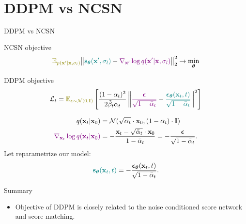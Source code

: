 \section{DDPM vs NCSN}
\begin{frame}{DDPM vs NCSN}
	\begin{block}{NCSN objective}
		\vspace{-0.2cm}
		\[
			{\color{olive}\bbE_{p(\bx' | \bx, \sigma_l)}}\bigl\| {\color{teal}\bs_{\btheta}(\bx', \sigma_l)} - {\color{violet}\nabla_{\bx'} \log q(\bx' | \bx, \sigma_l)} \bigr\|^2_2 \rightarrow \min_{\btheta}
		\]
	\end{block}
	\vspace{-0.3cm}
	\begin{block}{DDPM objective}
		\vspace{-0.2cm}
		\[
			\cL_t = {\color{olive}\bbE_{\bepsilon \sim \cN(0, \bI)}} \left[ \frac{(1 - \alpha_t)^2}{2\tilde{\beta}_t \alpha_t} \left\| {\color{violet}\frac{\bepsilon}{\sqrt{1 - \bar{\alpha}_t}}} - {\color{teal}\frac{\bepsilon_{\btheta}(\bx_t, t)}{\sqrt{1 - \bar{\alpha}_t}}}\right\|^2 \right]
		\]
		\vspace{-0.7cm}
	\end{block}
	\begin{align*}
		q(\mathbf{x}_t | \mathbf{x}_0) &= \mathcal{N}(\sqrt{\bar{\alpha}_t} \cdot \mathbf{x}_0, (1 - \bar{\alpha}_t) \cdot \mathbf{I}) \\
		{\color{violet}\nabla_{\mathbf{x}_t} \log q(\mathbf{x}_t | \mathbf{x}_0)} &= - \frac{\mathbf{x}_t - \sqrt{\bar{\alpha}_t} \cdot \mathbf{x}_0}{1 - \bar{\alpha}_t} = - \frac{\boldsymbol{\epsilon}}{\sqrt{1 - \bar{\alpha}_t}}.
	\end{align*}
		Let reparametrize our model: 
		\vspace{-0.2cm}
		\[
			{\color{teal}\mathbf{s}_{\boldsymbol{\theta}}(\mathbf{x}_t, t)} = - \frac{\boldsymbol{\epsilon}_{\boldsymbol{\theta}}(\mathbf{x}_t, t)}{\sqrt{1 - \bar{\alpha}_t}}.
		\]
	\end{frame}
\begin{frame}{Summary}
	\begin{itemize}
		\item Objective of DDPM is closely related to the noise conditioned score network and score matching.	
	\end{itemize}
\end{frame}
 